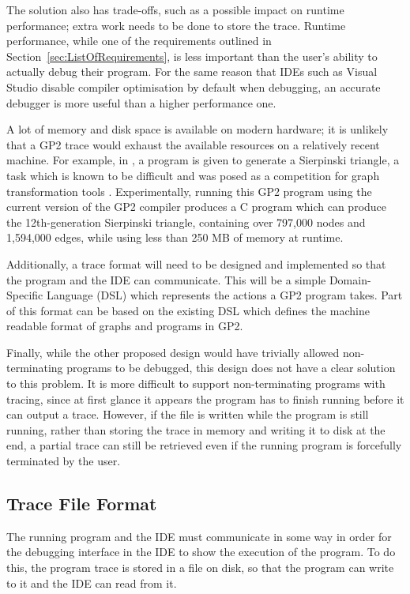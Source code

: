 \documentclass[authoryearcitations]{UoYCSproject}
\begin{document}
The solution also has trade-offs, such as a possible impact on runtime
performance; extra work needs to be done to store the trace. Runtime performance,
while one of the requirements outlined in Section~\ref{sec:ListOfRequirements},
is less important than the user's ability to actually debug their program. For
the same reason that IDEs such as Visual Studio disable compiler optimisation
by default when debugging, an accurate debugger is more useful than a higher
performance one.

A lot of memory and disk space is available on modern hardware; it is unlikely
that a GP2 trace would exhaust the available resources on a relatively recent
machine. For example, in \citep{GP2Interpreter}, a program is given to generate
a Sierpinski triangle, a task which is known to be difficult and was posed as
a competition for graph transformation tools \citep{SierpinskiCompetition}.
Experimentally, running this GP2 program using the current version of the GP2
compiler produces a C program which can produce the 12th-generation Sierpinski
triangle, containing over 797,000 nodes and 1,594,000 edges, while using less
than 250 MB of memory at runtime.

Additionally, a trace format will need to be designed and implemented so that
the program and the IDE can communicate. This will be a simple Domain-Specific
Language (DSL) which represents the actions a GP2 program takes. Part of this
format can be based on the existing DSL which defines the machine readable 
format of graphs and programs in GP2.

Finally, while the other proposed design would have trivially allowed
non-terminating programs to be debugged, this design does not have a clear
solution to this problem. It is more difficult to support non-terminating
programs with tracing, since at first glance it appears the program has to
finish running before it can output a trace. However, if the file is written
while the program is still running, rather than storing the trace in memory and
writing it to disk at the end, a partial trace can still be retrieved even if
the running program is forcefully terminated by the user.


\subsection{Trace File Format}

The running program and the IDE must communicate in some way in order for the
debugging interface in the IDE to show the execution of the program. To do this,
the program trace is stored in a file on disk, so that the program can write to
it and the IDE can read from it.
\end{document}
